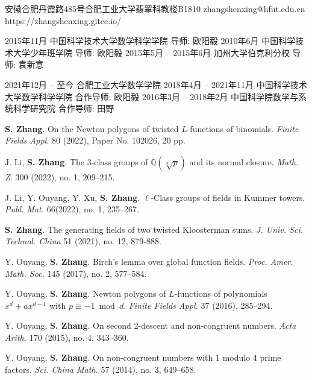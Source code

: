 \documentclass[11pt]{article}
\begin{document}
	{安徽合肥丹霞路485号合肥工业大学翡翠科教楼B1810}
	{zhangshenxing@hfut.edu.cn}
	{https://zhangshenxing.gitee.io/}


\begin{cvstage}
	{2015年11月}
	{中国科学技术大学数学科学学院}
	{导师: 欧阳毅}
	{2010年6月}
	{中国科学技术大学少年班学院}
	{导师: 欧阳毅}
	{2015年5月 -- 2015年6月}
	{加州大学伯克利分校}
	{导师: 袁新意}
\end{cvstage}


\begin{cvstage}
	{2021年12月 -- 至今}
	{合肥工业大学数学学院}
	{}
	{2018年4月 -- 2021年11月}
	{中国科学技术大学数学科学学院}
	{合作导师: 欧阳毅}
	{2016年3月 -- 2018年2月}
	{中国科学院数学与系统科学研究院}
	{合作导师: 田野}
\end{cvstage}


\begin{cvlist}
\item \textbf{S. Zhang}.
On the Newton polygons of twisted $L$-functions of binomials.
{\em Finite Fields Appl.} 80 (2022), Paper No. 102026, 20 pp.

\item J. Li, \textbf{S. Zhang}.
The $3$-class groups of $\mathbb{Q}(\sqrt[3]{p})$ and its normal closure.
{\em Math. Z.} 300 (2022), no. 1, 209--215.

\item J. Li, Y. Ouyang, Y. Xu, \textbf{S. Zhang}.
$\ell$-Class groups of fields in Kummer towers.
{\em Publ. Mat.} 66(2022), no. 1, 235--267.

\item \textbf{S. Zhang}.
The generating fields of two twisted Kloosterman sums.
{\em J. Univ. Sci. Technol. China} 51 (2021), no. 12, 879-888.

\item Y. Ouyang, \textbf{S. Zhang}.
Birch's lemma over global function fields.
{\em Proc. Amer. Math. Soc.} 145 (2017), no. 2, 577--584.

\item Y. Ouyang, \textbf{S. Zhang}.
Newton polygons of $L$-functions of polynomials $x^d+ax^{d-1}$ with $p\equiv -1 \bmod d$.
{\em Finite Fields Appl.} 37 (2016), 285--294.

\item Y. Ouyang, \textbf{S. Zhang}.
On second 2-descent and non-congruent numbers.
{\em Acta Arith.} 170 (2015), no. 4, 343--360.

\item Y. Ouyang, \textbf{S. Zhang}.
On non-congruent numbers with 1 modulo 4 prime factors.
{\em Sci. China Math.} 57 (2014), no. 3, 649--658.
\end{cvlist}
\end{document}
